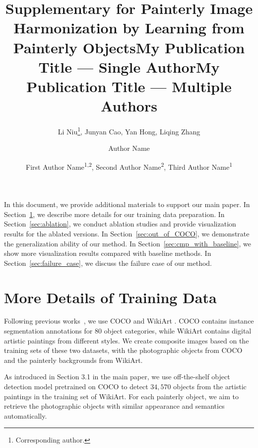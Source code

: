 \documentclass[letterpaper]{article} %
\title{Supplementary for Painterly Image Harmonization by Learning from Painterly Objects}
\author{
    Li Niu\thanks{Corresponding author.},
    Junyan Cao, 
    Yan Hong, 
    Liqing Zhang 
    \\
}
\title{My Publication Title --- Single Author}
\author {
    Author Name
}
\title{My Publication Title --- Multiple Authors}
\author {
    First Author Name\textsuperscript{\rm 1,\rm 2},
    Second Author Name\textsuperscript{\rm 2},
    Third Author Name\textsuperscript{\rm 1}
}
\begin{document}
\maketitle

In this document, we provide additional materials to support our main paper. In Section~\ref{sec:training_set_preparation}, we describe more details for our training data preparation. In Section~\ref{sec:ablation}, we conduct ablation studies and provide visualization results for the ablated versions. In Section~\ref{sec:out_of_COCO}, we demonstrate the generalization ability of our method.  In Section~\ref{sec:cmp_with_baseline}, we show more visualization results compared with baseline methods.  In Section~\ref{sec:failure_case}, we discuss the failure case of our method.

\section{More Details of Training Data} \label{sec:training_set_preparation}

Following previous works~\cite{peng2019element,cao2022painterly}, we use COCO \cite{lin2014microsoft} and WikiArt \cite{nichol2016painter}.
COCO \cite{lin2014microsoft} contains instance segmentation annotations for 80 object categories, while WikiArt \cite{nichol2016painter} contains digital artistic paintings from different styles.
We create composite images based on the training sets of these two datasets, with the photographic objects from COCO and the painterly backgrounds from WikiArt.

As introduced in Section 3.1 in the main paper, we use off-the-shelf  object detection model \cite{wu2019detectron2} pretrained on COCO \cite{lin2014microsoft} to detect $34,570$ objects from the artistic paintings in the training set of WikiArt. 
For each painterly object, we aim to retrieve the photographic objects with similar appearance and semantics automatically. 
\end{document}
